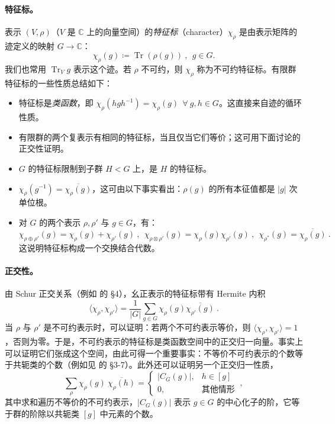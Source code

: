 \documentclass[11pt,a4paper,fontset=windows]{ctexart}
\numberwithin{equation}{section}
\newcommand{\myparagraph}[1]{\paragraph{#1}\mbox\\}
\newcommand{\CC}{\mathbb{C}}
\def\rr{\rho}
\def\x{\chi}
\newcommand{\tr}{\operatorname{Tr}}
\begin{document}
\myparagraph{特征标。}
表示 $(V,\rr)$（$V$ 是 $\CC$ 上的向量空间）的\emph{特征标}（character）$\x_\rr$ 是由表示矩阵的迹定义的映射 $G\rightarrow\CC$：
\begin{equation}
\x_\rr(g)\coloneqq\tr(\rr(g))~,~~g\in G.
\end{equation}
我们也常用 $\tr_V g$ 表示这个迹。若 $\rr$ 不可约，则 $\x_\rr$ 称为不可约特征标。有限群特征标的一些性质总结如下：
\begin{itemize}

\item 特征标是\emph{类函数}，即 $\x_\rr\left(hgh^{-1}\right)=\x_\rr(g)~~\forall~g,h\in G$。这直接来自迹的循环性质。

\item 有限群的两个复表示有相同的特征标，当且仅当它们等价；这可用下面讨论的正交性证明。

\item $G$ 的特征标限制到子群 $H<G$ 上，是 $H$ 的特征标。

\item $\x_\rr\left(g^{-1}\right)=\overline{\x_\rr(g)}$，这可由以下事实看出：$\rr(g)$ 的所有本征值都是 $|g|$ 次单位根。

\item 对 $G$ 的两个表示 $\rr,\rr'$ 与 $g\in G$，有：
\begin{equation}
\x_{\rr\oplus\rr'}(g)=\x_{\rr}(g)+\x_{\rr'}(g)~,~~\x_{\rr\otimes\rr'}(g)=\x_{\rr}(g)\x_{\rr'}(g)~,~~\x_{\rr^*}(g)=\overline{\x_{\rr}(g)}~.
\end{equation}
这说明特征标构成一个交换结合代数。
\end{itemize}

\myparagraph{正交性。}
由 Schur 正交关系（例如 \cite{JonesH.F.HughF.1998Grap} 的 \S 4），幺正表示的特征标带有 Hermite 内积
\begin{equation}
\label{eq:orthog_char}
\langle\x_\rr,\x_{\rr'}\rangle=\frac{1}{|G|}\sum_{g\in G}\x_\rr(g)\overline{\x_{\rr'}(g)}~.
\end{equation}
当 $\rho$ 与 $\rho'$ 是不可约表示时，可以证明：若两个不可约表示等价，则 $\langle\x_\rr,\x_{\rr'}\rangle=1$，否则为零。于是，不可约表示的特征标是类函数空间中的正交归一向量。事实上可以证明它们张成这个空间，由此可得一个重要事实：不等价不可约表示的个数等于共轭类的个数（例如见 \cite{HamermeshMorton1962Gtai} 的 \S 3-7）。此外还可以证明另一个正交归一性质，
\begin{equation}
\sum_{\rr}^{}\x_{\rr}(g)~\overline{\x_{\rr}(h)}=\left\lbrace\begin{matrix} |C_G(g)|, & h\in [g] \\ 0, & \text{其他情形} \end{matrix}\right.~,
\end{equation}
其中求和遍历不等价的不可约表示，$|C_G(g)|$ 表示 $g\in G$ 的中心化子的阶，它等于群的阶除以共轭类 $[g]$ 中元素的个数。
\end{document}
